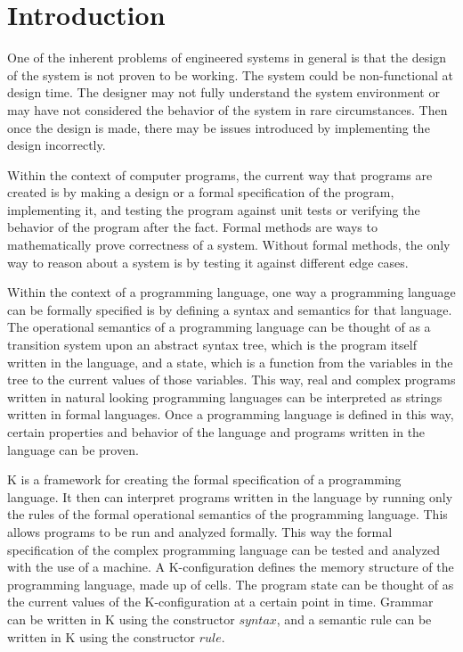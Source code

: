 \chapter{Introduction}
One of the inherent problems of engineered systems in general is that the design of the system is not proven to be working. The system could be non-functional at design time. The designer may not fully understand the system environment or may have not considered the behavior of the system in rare circumstances. Then once the design is made, there may be issues introduced by implementing the design incorrectly.

Within the context of computer programs, the current way that programs are created is by making a design or a formal specification of the program, implementing it, and testing the program against unit tests or verifying the behavior of the program after the fact.
Formal methods are ways to mathematically prove correctness of a system. Without formal methods, the only way to reason about a system is by testing it against different edge cases.

Within the context of a programming language, one way a programming language can be formally specified is by defining a syntax and semantics for that language.
The operational semantics of a programming language can be thought of as a transition system upon an abstract syntax tree, which is the program itself written in the language, and a state, which is a function from the variables in the tree to the current values of those variables. 
This way, real and complex programs written in natural looking programming languages can be interpreted as strings written in formal languages. Once a programming language is defined in this way, certain properties and behavior of the language and programs written in the language can be proven.

K is a framework for creating the formal specification of a programming language. It then can interpret programs written in the language by running only the rules of the formal operational semantics of the programming language. This allows programs to be run and analyzed formally. This way the formal specification of the complex programming language can be tested and analyzed with the use of a machine.
A K-configuration defines the memory structure of the programming language, made up of cells. The program state can be thought of as the current values of the K-configuration at a certain point in time.
Grammar can be written in K using the constructor $syntax$, and a semantic rule can be written in K using the constructor $rule$.

